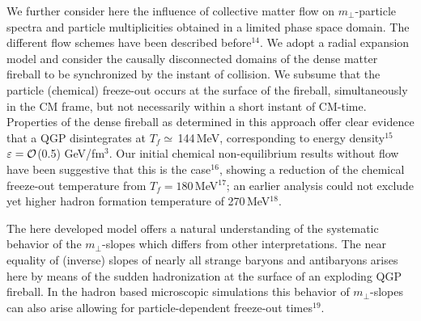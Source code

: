 \begin{mdframed}[linecolor=gray,roundcorner=12pt,backgroundcolor=Dandelion!15,linewidth=1pt,leftmargin=0cm,rightmargin=0cm,topline=true,bottomline=true,skipabove=12pt]
We further consider here the influence of collective matter flow on $m_\bot$-particle spectra and particle multiplicities obtained in a limited phase space domain. The different flow schemes have been described before$^{14}$. We adopt a radial expansion model and consider the causally disconnected domains of the dense matter fireball to be synchronized by the instant of collision. We subsume that the particle (chemical) freeze-out occurs at the surface of the fireball, simultaneously in the CM frame, but not necessarily within a short instant of CM-time. Properties of the dense fireball as determined in this approach offer clear evidence that a QGP disintegrates at $T_f\simeq$\,144\,MeV, corresponding to energy density$^{15}$ $\varepsilon=\cal O$(0.5) GeV/fm$^3$. Our initial chemical non-equilibrium results without flow have been suggestive that this is the case$^{16}$, showing a reduction of the chemical freeze-out temperature from $T_f=180$\,MeV$^{17}$; an earlier analysis could not exclude yet higher hadron formation temperature of 270\,MeV$^{18}$. 

The here developed model offers a natural understanding of the systematic behavior of the $m_\bot$-slopes which differs from other interpretations. The near equality of (inverse) slopes of nearly all strange baryons and antibaryons arises here by means of the sudden hadronization at the surface of an exploding QGP fireball. In the hadron based microscopic simulations this behavior of $m_\bot$-slopes can also arise allowing for particle-dependent freeze-out times$^{19}$.


\end{mdframed}
